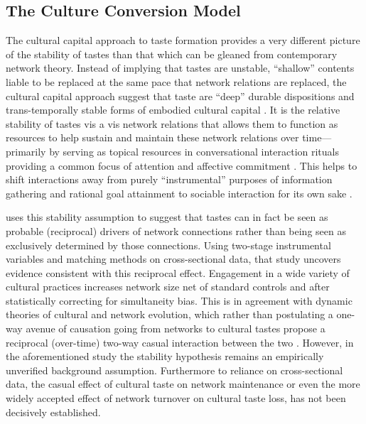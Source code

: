 \subsection{The Culture Conversion Model}
\label{subsec:cult}

The cultural capital approach to taste formation provides a very different picture of the stability of tastes than that which can be gleaned from contemporary network theory.  Instead of implying that tastes are unstable, ``shallow'' contents liable to be replaced at the same pace that network relations are replaced, the cultural capital approach suggest that taste are ``deep'' durable dispositions and trans-temporally stable forms of embodied cultural capital \citep{bourdieu86, holt98}.  It is the relative stability of tastes vis a vis network relations that allows them to function as resources to help sustain and maintain these network relations over time---primarily by serving as topical resources in conversational interaction rituals \citep{dimaggio87, lizardo06a} providing a common focus of attention and affective commitment \citep{collins04}.  This helps to shift interactions away from purely ``instrumental'' purposes of information gathering and rational goal attainment to sociable interaction for its own sake \citep{granovetter02, simmel49}. 

\citet{lizardo06a} uses this stability assumption to suggest that tastes can in fact be seen as probable (reciprocal) drivers of network connections rather than being seen as exclusively determined by those connections.  Using two-stage instrumental variables and matching methods on cross-sectional data, that study uncovers evidence consistent with this reciprocal effect. Engagement in a wide variety of cultural practices increases network size net of standard controls and after statistically correcting for simultaneity bias.  This is in agreement with dynamic theories of cultural and network evolution, which rather than postulating a one-way avenue of causation going from networks to cultural tastes propose a reciprocal (over-time) two-way casual interaction between the two \citep{carley91, mark98a}. However, in the aforementioned study the stability hypothesis remains an empirically unverified background assumption.  Furthermore to reliance on cross-sectional data, the casual effect of cultural taste on network maintenance or even the more widely accepted effect of network turnover on cultural taste loss, has not been decisively established.
 
